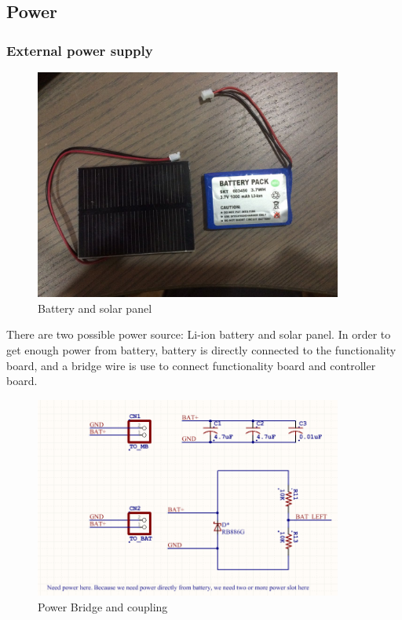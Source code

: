   
  \subsection{Power}
  \subsubsection{External power supply}
    \begin{figure}[ht]
    \centering
    \includegraphics[width=0.9\textwidth]{battery_solar.jpg}
    \caption{\label{fig:Battery_solar}Battery and solar panel}
    \end{figure} 
    There are two possible power source: Li-ion battery and solar panel. In order to get enough power from battery, battery is directly connected to the functionality board, and a bridge wire is use to connect functionality board and controller board. 
    \begin{figure}[ht]
    \centering
    \includegraphics[width=0.9\textwidth]{power_bridge.png}
    \caption{\label{fig:power_bridge}Power Bridge and coupling}
    \end{figure} 

